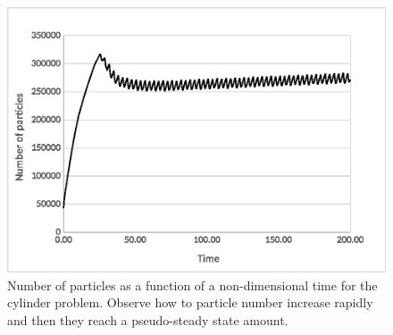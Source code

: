 \begin{figure}[htp] 
\centering 
\includegraphics[scale=.6]{./imgs/npart_cyl_excel.eps}
\caption{Number of particles as a function of a non-dimensional time for the cylinder problem. Observe how to particle number increase rapidly and then they reach a pseudo-steady state amount.}
\label{fig:cyl_npart}
\end{figure}
